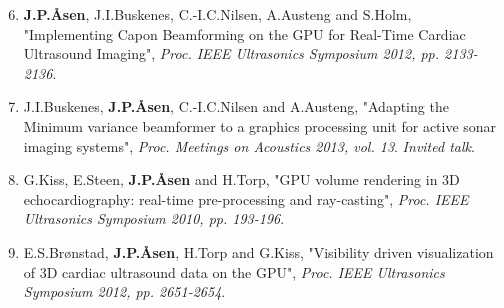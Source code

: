 \documentclass[10pt,b5paper,twoside]{book}
\begin{document}
\begin{enumerate}[VI]
\setcounter{enumi}{5}
\renewcommand\labelenumi{\bfseries\theenumi}

	\item \textbf{J.\:P.\:\AA{}sen}, J.\:I.\:Buskenes, C.-I.\:C.\:Nilsen, A.\:Austeng and S.\:Holm, "Implementing Capon Beamforming on the GPU for Real-Time Cardiac Ultrasound Imaging", {\it Proc. IEEE Ultrasonics Symposium 2012, pp. 2133-2136}.

	\item J.\:I.\:Buskenes, \textbf{J.\:P.\:\AA{}sen}, C.-I.\:C.\:Nilsen and A.\:Austeng, "Adapting the Minimum variance beamformer to a graphics processing unit for active sonar imaging systems", {\it Proc. Meetings on Acoustics 2013, vol. 13}. \textit{Invited talk}.
	
	\item G.\:Kiss, E.\:Steen, \textbf{J.\:P.\:\AA{}sen} and H.\:Torp, "GPU volume rendering in 3D echocardiography: real-time pre-processing and ray-casting", {\it Proc. IEEE Ultrasonics Symposium 2010, pp. 193-196}.


	\item E.\:S.\:Br\o{}nstad, \textbf{J.\:P.\:\AA{}sen}, H.\:Torp and G.\:Kiss, "Visibility driven visualization of 3D cardiac ultrasound data on the GPU", {\it Proc. IEEE Ultrasonics Symposium 2012, pp. 2651-2654}.
\end{enumerate}

\newpage\thispagestyle{empty}
\pagestyle{fancy}

%

\cleardoublepage
{}
\renewcommand*\contentsname{Contents}
\tableofcontents

\cleardoublepage
{}
\printnomenclature

\cleardoublepage
\setcounter{page}{1}
\renewcommand{\thepage}{\arabic{page}}


\begin{bibunit}[IEEEtran]
\label{chap1}




\newpage{} 
\end{bibunit}
\end{document}

